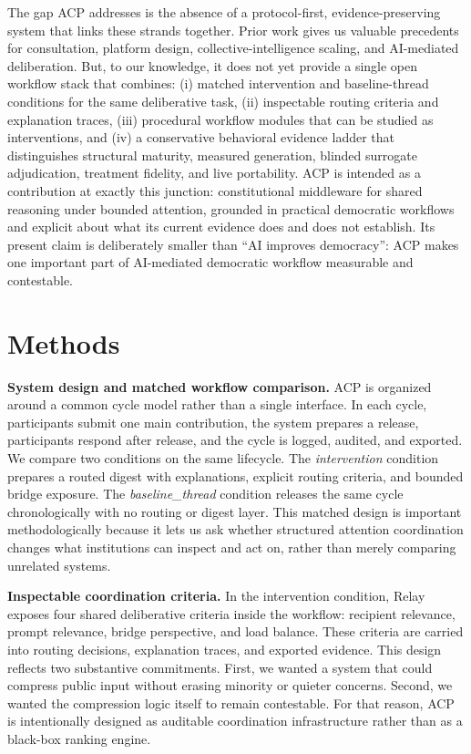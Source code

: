 \documentclass[11pt]{article}
\begin{document}
\vspace{0.1in}
The gap ACP addresses is the absence of a protocol-first, evidence-preserving system that links these strands together. Prior work gives us valuable precedents for consultation, platform design, collective-intelligence scaling, and AI-mediated deliberation. But, to our knowledge, it does not yet provide a single open workflow stack that combines: (i) matched intervention and baseline-thread conditions for the same deliberative task, (ii) inspectable routing criteria and explanation traces, (iii) procedural workflow modules that can be studied as interventions, and (iv) a conservative behavioral evidence ladder that distinguishes structural maturity, measured generation, blinded surrogate adjudication, treatment fidelity, and live portability. ACP is intended as a contribution at exactly this junction: constitutional middleware for shared reasoning under bounded attention, grounded in practical democratic workflows and explicit about what its current evidence does and does not establish. Its present claim is deliberately smaller than ``AI improves democracy'': ACP makes one important part of AI-mediated democratic workflow measurable and contestable.

\section{Methods}

\textbf{System design and matched workflow comparison.} ACP is organized around a common cycle model rather than a single interface. In each cycle, participants submit one main contribution, the system prepares a release, participants respond after release, and the cycle is logged, audited, and exported. We compare two conditions on the same lifecycle. The \emph{intervention} condition prepares a routed digest with explanations, explicit routing criteria, and bounded bridge exposure. The \emph{baseline\_thread} condition releases the same cycle chronologically with no routing or digest layer. This matched design is important methodologically because it lets us ask whether structured attention coordination changes what institutions can inspect and act on, rather than merely comparing unrelated systems.

\vspace{0.1in}
\textbf{Inspectable coordination criteria.} In the intervention condition, Relay exposes four shared deliberative criteria inside the workflow: recipient relevance, prompt relevance, bridge perspective, and load balance. These criteria are carried into routing decisions, explanation traces, and exported evidence. This design reflects two substantive commitments. First, we wanted a system that could compress public input without erasing minority or quieter concerns. Second, we wanted the compression logic itself to remain contestable. For that reason, ACP is intentionally designed as auditable coordination infrastructure rather than as a black-box ranking engine.
\end{document}
